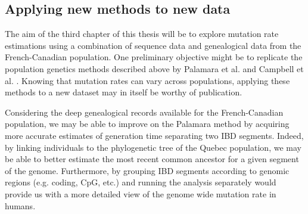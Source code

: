 \documentclass[
11pt, %
oneside, %
english, %
doublespacing, %
headsepline, %
chapterinoneline, %
]{MastersDoctoralThesis} %
\begin{document}
\subsection{Applying new methods to new data}
The aim of the third chapter of this thesis will be to explore mutation rate estimations using a combination of sequence data and genealogical data from the French-Canadian population.
One preliminary objective might be to replicate the population genetics methods described above by Palamara et al. and Campbell et al. \citep{Palamara2015,Campbell2012}.
Knowing that mutation rates can vary across populations, applying these methods to a new dataset may in itself be worthy of publication.

Considering the deep genealogical records available for the French-Canadian population, we may be able to improve on the Palamara method by acquiring more accurate estimates of generation time separating two IBD segments.
Indeed, by linking individuals to the phylogenetic tree of the Quebec population, we may be able to better estimate the most recent common ancestor for a given segment of the genome.
Furthermore, by grouping IBD segments according to genomic regions (e.g. coding, CpG, etc.) and running the analysis separately would provide us with a more detailed view of the genome wide mutation rate in humans.


\clearpage
\appendix %
\end{document}
